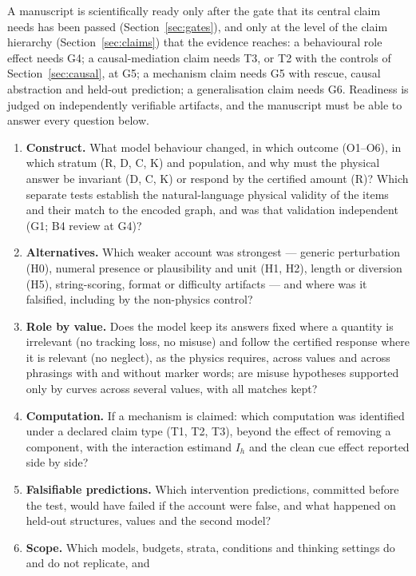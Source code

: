 \documentclass[10pt,a4paper]{article}
\begin{document}
A manuscript is scientifically ready only after the gate that its central claim needs has been passed
(Section~\ref{sec:gates}), and only at the level of the claim hierarchy (Section~\ref{sec:claims}) that the
evidence reaches: a behavioural role effect needs G4; a causal-mediation claim needs T3, or T2 with the controls of
Section~\ref{sec:causal}, at G5; a mechanism claim needs G5 with rescue, causal abstraction and held-out
prediction; a generalisation claim needs G6. Readiness is judged on independently verifiable artifacts, and the
manuscript must be able to answer every question below.

\begin{enumerate}
\item \textbf{Construct.} What model behaviour changed, in which outcome (O1--O6), in which stratum (R, D, C, K)
and population, and why must the physical answer be invariant (D, C, K) or respond by the certified amount (R)?
Which separate tests establish the natural-language physical validity of the items and their match to the encoded
graph, and was that validation independent (G1; B4 review at G4)?
\item \textbf{Alternatives.} Which weaker account was strongest --- generic perturbation (H0), numeral presence or
plausibility and unit (H1, H2), length or diversion (H5), string-scoring, format or difficulty artifacts --- and
where was it falsified, including by the non-physics control?
\item \textbf{Role by value.} Does the model keep its answers fixed where a quantity is irrelevant (no tracking loss, no misuse) and follow the certified response where it is relevant (no neglect), as the physics requires,
across values and across phrasings with and without marker words; are misuse hypotheses supported only by curves
across several values, with all matches kept?
\item \textbf{Computation.} If a mechanism is claimed: which computation was identified under a declared claim
type (T1, T2, T3), beyond the effect of removing a component, with the interaction estimand $I_h$ and the clean
cue effect reported side by side?
\item \textbf{Falsifiable predictions.} Which intervention predictions, committed before the test, would have
failed if the account were false, and what happened on held-out structures, values and the second model?
\item \textbf{Scope.} Which models, budgets, strata, conditions and thinking settings do and do not replicate, and

\end{enumerate}
\end{document}
